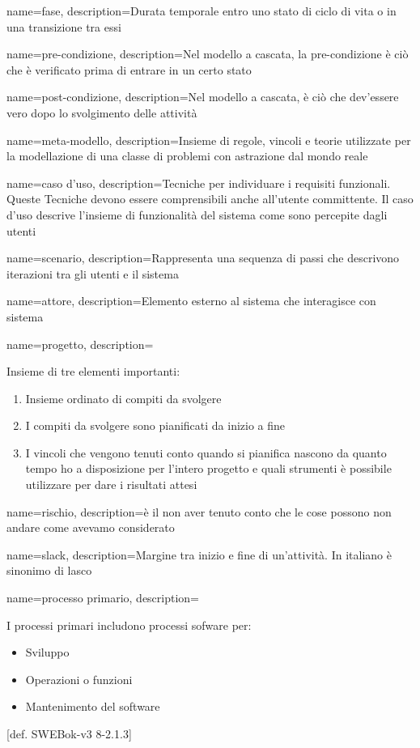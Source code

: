{
name=fase,
description={Durata temporale entro uno stato di ciclo di vita o in una transizione tra essi}
}


{
name=pre-condizione,
description={Nel modello a cascata, la pre-condizione \`e ci\`o che \`e verificato prima di entrare in un certo stato}
}

{
name=post-condizione,
description={Nel modello a cascata, \`e ci\`o che dev'essere vero dopo lo svolgimento delle attivit\`a}
}

{
name=meta-modello,
description={Insieme di regole, vincoli e teorie utilizzate per la modellazione di una classe di problemi con astrazione dal mondo reale}
}

{
name=caso d'uso,
description={Tecniche per individuare i requisiti funzionali. Queste Tecniche devono essere comprensibili anche all'utente committente. Il caso d'uso descrive l'insieme di funzionalit\`a del sistema come sono percepite dagli utenti}
}

{
name=scenario,
description={Rappresenta una sequenza di passi che descrivono iterazioni tra gli utenti e il sistema}
}

{
name=attore,
description={Elemento esterno al sistema che interagisce con sistema}
}

{
name=progetto,
description={Insieme di tre elementi importanti: \begin{enumerate}
\item Insieme ordinato di compiti da svolgere
\item I compiti da svolgere sono pianificati da inizio a fine
\item I vincoli che vengono tenuti conto quando si pianifica nascono da quanto tempo ho a disposizione per l'intero progetto e quali strumenti \`e possibile utilizzare per dare i risultati attesi
\end{enumerate}
}
}

{
name=rischio,
description={\`e il non aver tenuto conto che le cose possono non andare come avevamo considerato}
}

{
name=slack,
description={Margine tra inizio e fine di un'attivit\`a. In italiano \`e sinonimo di lasco}
}

{
name=processo primario,
description={I processi primari includono processi sofware per: \begin{itemize}
\item Sviluppo
\item Operazioni o funzioni
\item Mantenimento del software
\end{itemize}
[def. SWEBok-v3 8-2.1.3]}
}

